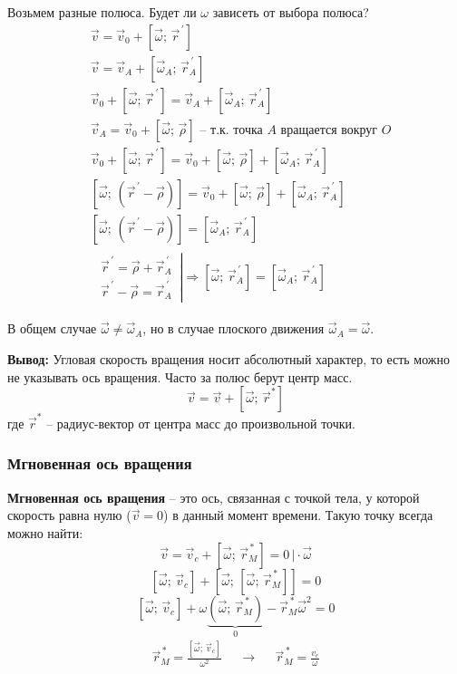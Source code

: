 Возьмем разные полюса. Будет ли $\omega$ зависеть от выбора полюса?
\begin{align*}
	&\vec{v}=\vec{v}_0+ [\vec{\omega}; \, \vec{r}^{\, \prime}] \\
	&\vec{v}=\vec{v}_A+[\vec{\omega}_A; \, \vec{r}^{\, \prime}_A] \\
	& \vec{v}_0+ [\vec{\omega}; \, \vec{r}^{\, \prime}] = \vec{v}_A+[\vec{\omega}_A; \, \vec{r}^{\, \prime}_A]\\
	&\vec{v}_A = \vec{v}_0 + [\vec{\omega}; \, \vec{\rho}] \text{ -- т.к. точка $A$ вращается вокруг $O$}\\
	& \vec{v}_0+ [\vec{\omega}; \, \vec{r}^{\, \prime}] = \vec{v}_0+[\vec{\omega}; \, \vec{\rho}]+[\vec{\omega}_A; \, \vec{r}^{\, \prime}_A] \\
	& [\vec{\omega}; \, (\vec{r}^{\, \prime} - \vec{\rho})] = \vec{v}_0+[\vec{\omega}; \, \vec{\rho}]+[\vec{\omega}_A; \, \vec{r}^{\, \prime}_A] \\
	& [\vec{\omega}; \, (\vec{r}^{\, \prime} - \vec{\rho})] = [\vec{\omega}_A; \, \vec{r}^{\, \prime}_A] \\
	& \begin{aligned}
		\left.\begin{matrix}
			\vec{r}^{\,\prime} = \vec{\rho} + \vec{r}_A^{\, \prime} \\
			\vec{r}^{\,\prime} - \vec{\rho} = \vec{r}_A^{\,\prime}
		\end{matrix} \, \right|
		\Rightarrow [\vec{\omega}; \, \vec{r}_A^{\,\prime}] = [\vec{\omega}_A; \, \vec{r}_A^{\,\prime}]
	\end{aligned}
\end{align*}

В общем случае $\vec{\omega} \neq \vec{\omega}_A$, но в случае плоского движения $\vec{\omega}_A = \vec{\omega}$.

\textbf{Вывод:} Угловая скорость вращения носит абсолютный характер, то есть можно не указывать ось вращения. Часто за полюс берут центр масс.
\[\vec{v} = \vec{v} + [\vec{\omega}; \, \vec{r}^*]\]
где $\vec{r}^*$ -- радиус-вектор от центра масс до произвольной точки.

\subsubsection*{Мгновенная ось вращения}

\textbf{Мгновенная ось вращения} -- это ось, связанная с точкой тела, у которой скорость равна нулю ($\vec{v} = 0$) в данный момент времени. Такую точку всегда можно найти:
\[\vec{v} = \vec{v}_c + [\vec{\omega}; \, \vec{r}_M^{\,*}] = 0 \, \Big| \cdot \vec{\omega}\]
\[[\vec{\omega}; \, \vec{v}_c] + [\vec{\omega}; \, [\vec{\omega}; \, \vec{r}_M^{\, *}]] = 0\]
\[[\vec{\omega}; \, \vec{v}_c] + \omega\underbrace{(\vec{\omega}; \, \vec{r}_M^{\,*})}_{0} - \vec{r}_M^{\,*} \vec{\omega}^2 = 0\]
\[\begin{aligned}
	\vec{r}_M^{\,*} = \frac{[\vec{\omega}; \, \vec{v}_c]}{\omega^2} &&\to&& \vec{r}_M^{\,*} = \frac{v_c}{\omega}
\end{aligned}\]

